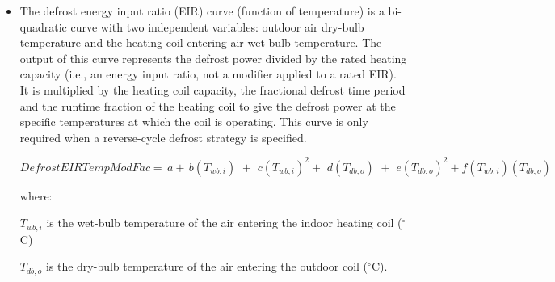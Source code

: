 \begin{itemize}
where:

\begin{equation}
PLR = part-load~ratio = \left( {\frac{{sensible~heating~load}}{{steady-state~sensible~heating~capacity}}} \right)
\end{equation}

The part-load fraction correlation should be normalized to a value of 1.0 when the part load ratio equals 1.0 (i.e., no efficiency losses when the compressor(s) run continuously for the simulation time step). For PLR values between 0 and 1 ( 0 \textless{} = PLR \textless{} 1), the following rules apply:  PLF \textgreater{} = 0.7 and PLF \textgreater{} = PLR.

If PLF \textless{} 0.7 a warning message is issued, the program resets the PLF value to 0.7, and the simulation proceeds. The runtime fraction of the coil is defined a PLR/PLF. If PLF \textless{} PLR, then a warning message is issued and the runtime fraction of the coil is limited to 1.0.

A typical part load fraction correlation for a conventional, single-speed DX heating coil (e.g., residential heat pump) would be:  PLF = 0.85 + 0.15(PLR).

  \item
The defrost energy input ratio (EIR) curve (function of temperature) is a bi-quadratic curve with two independent variables: outdoor air dry-bulb temperature and the heating coil entering air wet-bulb temperature. The output of this curve represents the defrost power divided by the rated heating capacity (i.e., an energy input ratio, not a modifier applied to a rated EIR). It is multiplied by the heating coil capacity, the fractional defrost time period and the runtime fraction of the heating coil to give the defrost power at the specific temperatures at which the coil is operating. This curve is only required when a reverse-cycle defrost strategy is specified.

\begin{equation}
DefrostEIRTempModFac = \,a + \,b\left( {{T_{wb,i}}} \right)\,\, + \,\,c{\left( {{T_{wb,i}}} \right)^2} + \,\,d\left( {{T_{db,o}}} \right)\,\, + \,\,e{\left( {{T_{db,o}}} \right)^2} + f\left( {{T_{wb,i}}} \right)\left( {{T_{db,o}}} \right)
\label{eq:SSEHPDXAirHeatCoilDefrostEIRTempModFac}
\end{equation}

where:

\({T_{wb,i}}\) is the wet-bulb temperature of the air entering the indoor heating coil (\(^{\circ}\)C)

\({T_{db,o}}\) is the dry-bulb temperature of the air entering the outdoor coil (\(^{\circ}\)C).
\end{itemize}

